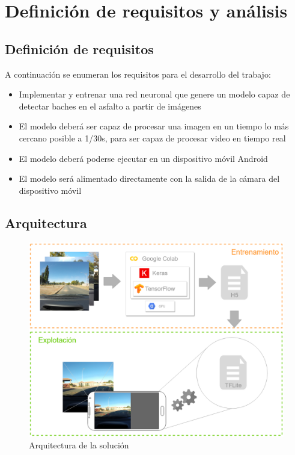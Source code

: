 \section{Definición de requisitos y análisis}
\label{sec:definicion_de_requisitos_y_analisis}

\subsection{Definición de requisitos}

A continuación se enumeran los requisitos para el desarrollo del trabajo:

\begin{itemize}
	\item Implementar y entrenar una red neuronal que genere un modelo capaz de detectar baches en el asfalto a partir de imágenes
	\item El modelo deberá ser capaz de procesar una imagen en un tiempo lo más cercano posible a 1/30s, para ser capaz de procesar video en tiempo real
	\item El modelo deberá poderse ejecutar en un dispositivo móvil Android
	\item El modelo será alimentado directamente con la salida de la cámara del dispositivo móvil
\end{itemize}

\subsection{Arquitectura}

\begin{figure}[H]
	\centering
	\includegraphics[width=\linewidth]{images/architecture.png}
	\caption{Arquitectura de la solución}
	\label{fig:architecture}
\end{figure}

